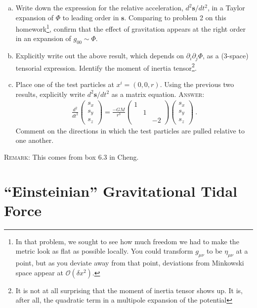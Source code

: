 \documentclass[12pt]{article}
\numberwithin{equation}{section}    %
\renewcommand{\vec}[1]{\mathbf{#1}} %
\begin{document}
\begin{enumerate}[(a)]
	\item Write down the expression for the relative acceleration, $d^2\vec{s}/dt^2$, in a Taylor expansion of $\Phi$ to leading order in $\vec{s}$. Comparing to problem 2 on this homework\footnote{In that problem, we sought to see how much freedom we had to make the metric look as flat as possible locally. You could transform $g_{\mu\nu}$ to be $\eta_{\mu\nu}$ at a point, but as you deviate away from that point, deviations from Minkowski space appear at $\mathcal O(\delta x^2)$.}, confirm that the effect of gravitation appears at the right order in an expansion of $g_{00} \sim \Phi$.
	\item Explicitly write out the above result, which depends on $\partial_i\partial_j\Phi$, as a (3-space) tensorial expression. Identify the moment of inertia tensor\footnote{It is not at all surprising that the moment of inertia tensor shows up. It is, after all, the quadratic term in a multipole expansion of the potential}.
	\item Place one of the test particles at $x^i = (0,0,r)$. Using the previous two results, explicitly write $d^2\vec{s}/dt^2$ as a matrix equation. \textsc{Answer}:
	\begin{align}
		\frac{d^2}{dt^2} 
		\begin{pmatrix}
			s_x\\
			s_y\\
			s_z
		\end{pmatrix}
		=
		\frac{-GM}{r^3}
		\begin{pmatrix}
			1 &&\\
			&1& \\
			&& -2
		\end{pmatrix}
		\begin{pmatrix}
			s_x\\
			s_y\\
			s_z
		\end{pmatrix} \ .
	\end{align}
	Comment on the directions in which the test particles are pulled relative to one another.
\end{enumerate}
\textsc{Remark}: This comes from box 6.3 in Cheng.


\section{``Einsteinian'' Gravitational Tidal Force}
\end{document}
